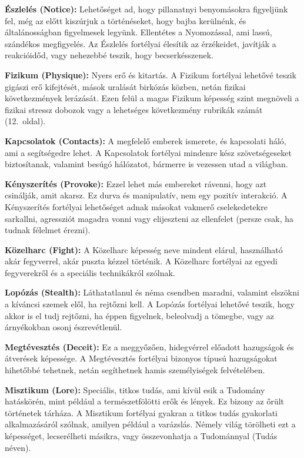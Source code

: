 \documentclass[oneside]{book}
\newcommand{\page}[1]{#1.~oldal}
\begin{document}
\textbf{Észlelés (Notice):} Lehetőséget ad, hogy pillanatnyi benyomásokra figyeljünk fel, még az előtt kiszúrjuk a történéseket, hogy bajba kerülnénk, és általánosságban figyelmesek legyünk. Ellentétes a Nyomozással, ami lassú, szándékos megfigyelés. Az Észlelés fortélyai élesítik az érzékeidet, javítják a reakcióidőd, vagy nehezebbé teszik, hogy becserkésszenek.

\textbf{Fizikum (Physique):} Nyers erő és kitartás. A Fizikum fortélyai lehetővé teszik gigászi erő kifejtését, mások uralását birkózás közben, netán fizikai következmények lerázását. Ezen felül a magas Fizikum képesség szint megnöveli a fizikai stressz dobozok vagy a lehetséges következmény rubrikák számát (\page{12}).

\textbf{Kapcsolatok (Contacts):} A megfelelő emberek ismerete, és kapcsolati háló, ami a segítségedre lehet. A Kapcsolatok fortélyai mindenre kész szövetségeseket biztosítanak, valamint besúgó hálózatot, bármerre is vezessen utad a világban.

\newpage

\textbf{Kényszerítés (Provoke):} Ezzel lehet más embereket rávenni, hogy azt csinálják, amit akarsz. Ez durva és manipulatív, nem egy pozitív interakció. A Kényszerítés fortélyai lehetőséget adnak másokat vakmerő cselekedetekre sarkallni, agressziót magadra vonni vagy elijeszteni az ellenfelet (persze csak, ha tudnak félelmet érezni).

\textbf{Közelharc (Fight):} A Közelharc képesség neve mindent elárul, használható akár fegyverrel, akár puszta  kézzel történik. A Közelharc fortélyai az egyedi fegyverekről és a speciális technikákról szólnak.

\textbf{Lopózás (Stealth):} Láthatatlanul és néma csendben maradni, valamint elszökni a kíváncsi szemek elől, ha rejtőzni kell. A Lopózás fortélyai lehetővé teszik, hogy akkor is el tudj rejtőzni, ha éppen figyelnek, beleolvadj a tömegbe, vagy az árnyékokban osonj észrevétlenül.

\textbf{Megtévesztés (Deceit):} Ez a meggyőzően, hidegvérrel előadott hazugságok és átverések képessége. A Megtévesztés fortélyai bizonyos típusú hazugságokat hihetőbbé tehetnek, netán segíthetnek hamis személyiségek felvételében.

\textbf{Misztikum (Lore):} Speciális, titkos tudás, ami kívül esik a Tudomány hatáskörén, mint például a természetfölötti erők és lények. Ez bizony az őrült történetek tárháza. A Misztikum fortélyai gyakran a titkos tudás gyakorlati alkalmazásáról szólnak, amilyen például a varázslás. Némely világ törölheti ezt a képességet, lecserélheti másikra, vagy összevonhatja a Tudománnyal (Tudás néven).
\end{document}
